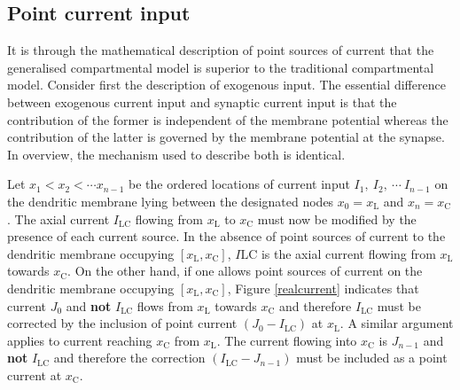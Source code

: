 \subsection{Point current input}
It is through the mathematical description of point sources of
current that the generalised compartmental model is superior to
the traditional compartmental model. Consider first the
description of exogenous input. The essential difference between
exogenous current input and synaptic current input is that the
contribution of the former is independent of the membrane
potential whereas the contribution of the latter is governed by
the membrane potential at the synapse. In overview, the mechanism
used to describe both is identical.

Let $x_1<x_2<\cdots x_{n-1}$ be the ordered locations of current
input $I_1,\ I_2,\ \cdots\ I_{n-1}$ on the dendritic membrane
lying between the designated nodes $x_0=x_\mathrm{L}$ and
$x_n=x_\mathrm{C}$. The axial current $I_\mathrm{LC}$ flowing from
$x_\mathrm{L}$ to $x_\mathrm{C}$ must now be modified by the
presence of each current source. In the absence of point sources
of current to the dendritic membrane occupying
$[x_\mathrm{L},x_\mathrm{C}]$, $I\mathrm{LC}$ is the axial current
flowing from $x_\mathrm{L}$ towards $x_\mathrm{C}$. On the other
hand, if one allows point sources of current on the dendritic
membrane occupying $[x_\mathrm{L},x_\mathrm{C}]$, Figure
\ref{realcurrent} indicates that current $J_0$ and \textbf{not}
$I_\mathrm{LC}$ flows from $x_\mathrm{L}$ towards $x_\mathrm{C}$
and therefore $I_\mathrm{LC}$ must be corrected by the inclusion
of point current $(J_0-I_\mathrm{LC})$ at $x_\mathrm{L}$. A
similar argument applies to current reaching $x_\mathrm{C}$ from
$x_\mathrm{L}$. The current flowing into $x_\mathrm{C}$ is
$J_{n-1}$ and \textbf{not} $I_\mathrm{LC}$ and therefore the
correction $(I_\mathrm{LC}-J_{n-1})$ must be included as a point
current at $x_\mathrm{C}$.

